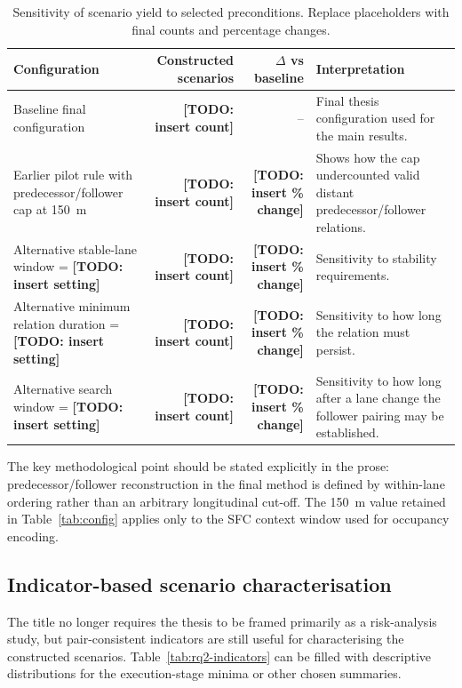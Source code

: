 \documentclass[12pt,a4paper,twoside,openright]{report}
\newcommand{\TODO}[1]{\textbf{[TODO: #1]}}
\begin{document}
    \begin{table}[H]
        \centering
        \caption{Sensitivity of scenario yield to selected preconditions. Replace placeholders with final counts and percentage changes.}
        \label{tab:rq2-sensitivity}
        {\small
        \setlength{\tabcolsep}{4pt}
            \begin{tabularx}{\textwidth}{@{}X r r X@{}}
\toprule
Configuration & \shortstack{Constructed\\scenarios} & \shortstack{$\Delta$ vs\\baseline} & Interpretation \\
\midrule
Baseline final configuration & \TODO{insert count} & -- & Final thesis configuration used for the main results. \\
Earlier pilot rule with predecessor/follower cap at \SI{150}{\meter} & \TODO{insert count} & \TODO{insert \% change} & Shows how the cap undercounted valid distant predecessor/follower relations. \\
Alternative stable-lane window = \TODO{insert setting} & \TODO{insert count} & \TODO{insert \% change} & Sensitivity to stability requirements. \\
Alternative minimum relation duration = \TODO{insert setting} & \TODO{insert count} & \TODO{insert \% change} & Sensitivity to how long the relation must persist. \\
Alternative search window = \TODO{insert setting} & \TODO{insert count} & \TODO{insert \% change} & Sensitivity to how long after a lane change the follower pairing may be established. \\
\bottomrule
            \end{tabularx}}
    \end{table}

    The key methodological point should be stated explicitly in the prose: predecessor/follower reconstruction in the final method is defined by within-lane ordering rather than an arbitrary longitudinal cut-off. The \SI{150}{\meter} value retained in Table~\ref{tab:config} applies only to the SFC context window used for occupancy encoding.

    \subsection{Indicator-based scenario characterisation}
    The title no longer requires the thesis to be framed primarily as a risk-analysis study, but pair-consistent indicators are still useful for characterising the constructed scenarios. Table~\ref{tab:rq2-indicators} can be filled with descriptive distributions for the execution-stage minima or other chosen summaries.
\end{document}
